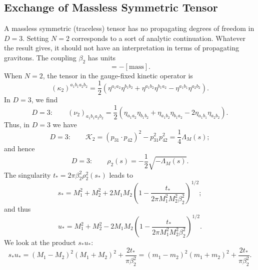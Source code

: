 \subsection{Exchange of Massless Symmetric Tensor}
A massless symmetric (traceless) tensor has no propagating degrees of freedom in $D = 3$. Setting $N = 2$ corresponds to a sort of analytic continuation. Whatever the result gives, it should not have an interpretation in terms of propagating gravitons. The coupling $\beta_{2}$ has units
\begin{equation}
	[\beta_{2}] = - [\text{mass}].
\end{equation}
When $N = 2$, the tensor in the gauge-fixed kinetic operator is
\begin{equation}
	(\kappa_{2})^{a_{1}b_{1} a_{2} b_{2}} = \frac{1}{2} \left( \eta^{a_{1} a_{2}} \eta^{b_{1} b_{2}} + \eta^{a_{1}b_{2}} \eta^{b_{1}a_{2}} - \eta^{a_{1}b_{1}} \eta^{a_{2}b_{2}} \right).
\end{equation}
In $D = 3$, we find
\begin{equation}
	D = 3: \qquad (\nu_{2})_{a_{1}b_{1} a_{2} b_{2}} = \frac{1}{2} \left( \eta_{a_{1} a_{2}} \eta_{b_{1} b_{2}} + \eta_{a_{1}b_{2}} \eta_{b_{1}a_{2}} - 2\eta_{a_{1}b_{1}} \eta_{a_{2}b_{2}} \right).
\end{equation}
Thus, in $D = 3$ we have
\begin{equation}
	D = 3: \qquad \mathcal{K}_{2} = (p_{31} \cdot p_{42})^{2} - p_{31}^{2} p_{42}^{2} = \frac{1}{4} \Lambda_{M}(s);
	\label{D3K2}
\end{equation}
and hence
\begin{equation}
	D = 3: \qquad \rho_{2}(s) = -\frac{1}{2} \sqrt{-\Lambda_{M}(s)}.
	\label{D3rho2}
\end{equation}
The singularity $t_{*} = 2 \pi \beta_{2}^{2} \rho_{2}^{2}(s_{*})$ leads to
\begin{equation}
	s_{*} = M_{1}^{2} + M_{2}^{2} + 2 M_{1} M_{2} \left( 1 - \frac{t_{*}}{2\pi M_{1}^{2} M_{2}^{2} \beta_{2}^{2}} \right)^{1/2};
	\label{3s2}
\end{equation}
and thus
\begin{equation}
	u_{*} = M_{1}^{2} + M_{2}^{2} - 2 M_{1} M_{2} \left( 1 - \frac{t_{*}}{2\pi M_{1}^{2} M_{2}^{2} \beta_{2}^{2}} \right)^{1/2}.
	\label{3u2}
\end{equation}
We look at the product $s_{*} u_{*}$:
\begin{equation}
	s_{*} u_{*} = (M_{1} - M_{2})^{2}(M_{1} + M_{2})^{2} + \frac{2 t_{*}}{\pi \beta_{2}^{2}}
	= (m_{1} - m_{2})^{2}(m_{1} + m_{2})^{2} + \frac{2 t_{*}}{\pi \beta_{2}^{2}}.
	\label{3su2}
\end{equation}

